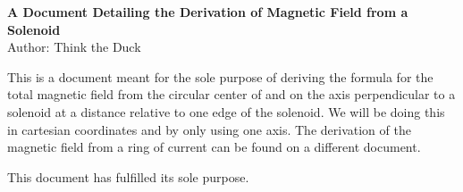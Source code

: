 \documentclass[12pt]{article}
\begin{document}
    \begin{center}
        \textbf{A Document Detailing the Derivation of Magnetic Field from a Solenoid}\\
        Author: Think the Duck
    \end{center}
    This is a document meant for the sole purpose of deriving the formula for the total magnetic field from the circular center of and on the axis perpendicular to a solenoid at a distance relative to one edge of the solenoid.
    We will be doing this in cartesian coordinates and by only using one axis.
    The derivation of the magnetic field from a ring of current can be found on a different document.

    This document has fulfilled its sole purpose.
\end{document}
